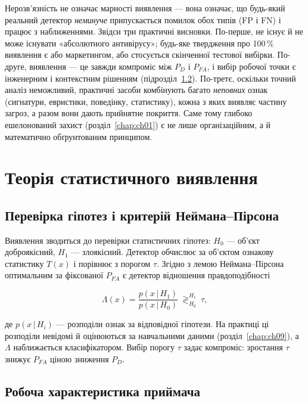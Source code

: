 Нерозв'язність не означає марності виявлення --- вона означає, що будь-який реальний детектор \emph{неминуче} припускається помилок обох типів (FP і FN) і працює з наближеннями. Звідси три практичні висновки. По-перше, не існує й не може існувати «абсолютного антивірусу»; будь-яке твердження про 100\,\% виявлення є або маркетингом, або стосується скінченної тестової вибірки. По-друге, виявлення --- це завжди компроміс між $P_D$ і $P_{FA}$, і вибір робочої точки є інженерним і контекстним рішенням (підрозділ~\ref{sec:ch03-roc}). По-третє, оскільки точний аналіз неможливий, практичні засоби комбінують багато \emph{неповних} ознак (сигнатури, евристики, поведінку, статистику), кожна з яких виявляє частину загроз, а разом вони дають прийнятне покриття. Саме тому глибоко ешелонований захист (розділ~\ref{chap:ch01}) є не лише організаційним, а й математично обґрунтованим принципом.

\section{Теорія статистичного виявлення}\label{sec:ch03-detection}

\subsection{Перевірка гіпотез і критерій Неймана--Пірсона}

Виявлення зводиться до перевірки статистичних гіпотез: $H_0$ --- об'єкт доброякісний, $H_1$ --- злоякісний. Детектор обчислює за об'єктом ознакову статистику $T(x)$ і порівнює з порогом $\tau$. Згідно з лемою Неймана--Пірсона~\cite{ch03:kay} оптимальним за фіксованої $P_{FA}$ є детектор відношення правдоподібності

\begin{equation}
\Lambda(x) = \frac{p(x\,|\,H_1)}{p(x\,|\,H_0)} \ \mathop{\gtrless}_{H_0}^{H_1}\ \tau,
\label{eq:ch03-np}
\end{equation}

де $p(x\,|\,H_i)$ --- розподіли ознак за відповідної гіпотези. На практиці ці розподіли невідомі й оцінюються за навчальними даними (розділ~\ref{chap:ch09}), а $\Lambda$ наближається класифікатором. Вибір порогу $\tau$ задає компроміс: зростання $\tau$ знижує $P_{FA}$ ціною зниження $P_D$.

\subsection{Робоча характеристика приймача}\label{sec:ch03-roc}

